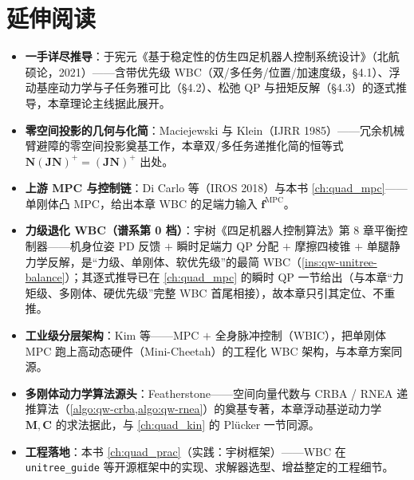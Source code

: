 \section*{延伸阅读}
\begin{itemize}
  \item \textbf{一手详尽推导}：于宪元《基于稳定性的仿生四足机器人控制系统设计》\cite{yu2021quadruped}（北航硕论，2021）——含带优先级 WBC（双/多任务/位置/加速度级，§4.1）、浮动基座动力学与子任务雅可比（§4.2）、松弛 QP 与扭矩反解（§4.3）的逐式推导，本章理论主线据此展开。
  \item \textbf{零空间投影的几何与化简}：Maciejewski 与 Klein\cite{maciejewski1985obstacle}（IJRR 1985）——冗余机械臂避障的零空间投影奠基工作，本章双/多任务递推化简的恒等式 $\boldsymbol{N}(\boldsymbol{J}\boldsymbol{N})^+=(\boldsymbol{J}\boldsymbol{N})^+$ 出处。
  \item \textbf{上游 MPC 与控制链}：Di Carlo 等\cite{dicarlo2018cheetah}（IROS 2018）与本书 \cref{ch:quad_mpc}——单刚体凸 MPC，给出本章 WBC 的足端力输入 $\boldsymbol{f}^{\mathrm{MPC}}$。
  \item \textbf{力级退化 WBC（谱系第 0 档）}：宇树《四足机器人控制算法》第 $8$ 章平衡控制器\cite{unitree2023quadruped}——机身位姿 PD 反馈 $+$ 瞬时足端力 QP 分配 $+$ 摩擦四棱锥 $+$ 单腿静力学反解，是“力级、单刚体、软优先级”的最简 WBC（\cref{ins:qw-unitree-balance}）；其逐式推导已在 \cref{ch:quad_mpc} 的瞬时 QP 一节给出（与本章“力矩级、多刚体、硬优先级”完整 WBC 首尾相接），故本章只引其定位、不重推。
  \item \textbf{工业级分层架构}：Kim 等\cite{kim2019wbic}——MPC $+$ 全身脉冲控制（WBIC），把单刚体 MPC 跑上高动态硬件（Mini-Cheetah）的工程化 WBC 架构，与本章方案同源。
  \item \textbf{多刚体动力学算法源头}：Featherstone\cite{featherstone2008rigid}——空间向量代数与 CRBA / RNEA 递推算法（\cref{algo:qw-crba,algo:qw-rnea}）的奠基专著，本章浮动基逆动力学 $\boldsymbol{M},\boldsymbol{C}$ 的求法据此，与 \cref{ch:quad_kin} 的 Plücker 一节同源。
  \item \textbf{工程落地}：本书 \cref{ch:quad_prac}（实践：宇树框架）——WBC 在 \texttt{unitree\_guide} 等开源框架中的实现、求解器选型、增益整定的工程细节。
\end{itemize}

